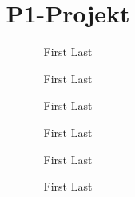 \title{P1-Projekt}
\author{
  First Last
  \and
  First Last
  \and
  First Last
  \and
  First Last
  \and
  First Last
  \and
  First Last
}